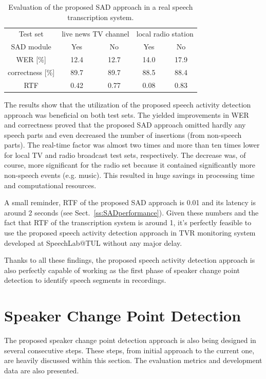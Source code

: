 \documentclass[FM,noheader,EN,bwtitles]{tulthesis}
\begin{document}
\begin{table}[ht]
\caption{Evaluation of the proposed SAD approach in a real speech transcription system.} 
\label{table:sr}
\centering
\begin{tabular}{ccccc}
\hline
Test set & \multicolumn{2}{c}{live news TV channel} & \multicolumn{2}{c}{local radio station} \\
SAD module & Yes & No & Yes & No \\
\hline
WER [\%] & 12.4 & 12.7 & 14.0 & 17.9 \\
correctness [\%] & 89.7 & 89.7 & 88.5 & 88.4 \\
RTF & 0.42 & 0.77 & 0.08 & 0.83 \\
\hline
\end{tabular}
\end{table}

The results show that the utilization of the proposed speech activity detection approach was beneficial on both test sets.
The yielded improvements in WER and correctness proved that the proposed SAD approach omitted hardly any speech parts and even decreased the number of insertions (from non-speech parts).
The real-time factor was almost two times and more than ten times lower for local TV and radio broadcast test sets, respectively.
The decrease was, of course, more significant for the radio set because it contained significantly more non-speech events (e.g. music).
This resulted in huge savings in processing time and computational resources.

A small reminder, RTF of the proposed SAD approach is 0.01 and its latency is around 2 seconds (see Sect.~\ref{ss:SADperformance}).
Given these numbers and the fact that RTF of the transcription system is around 1, it's perfectly feasible to use the proposed speech activity detection approach in TVR monitoring system developed at SpeechLab@TUL without any major delay.

Thanks to all these findings, the proposed speech activity detection approach is also perfectly capable of working as the first phase of speaker change point detection to identify speech segments in recordings.

\section{Speaker Change Point Detection}
\label{ch:SCH}
The proposed speaker change point detection approach is also being designed in several consecutive steps.
These steps, from initial approach to the current one, are heavily discussed within this section.
The evaluation metrics and development data are also presented.
\end{document}

